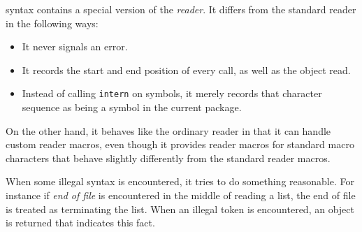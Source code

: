 \commonlisp{} syntax contains a special version of the \commonlisp{}
\emph{reader}.  It differs from the standard reader in the following
ways:

\begin{itemize}
\item It never signals an error.
\item It records the start and end position of every call, as well as
  the object read.
\item Instead of calling \texttt{intern} on symbols, it merely records
  that character sequence as being a symbol in the current package. 
\end{itemize}

On the other hand, it behaves like the ordinary \commonlisp{} reader
in that it can handle custom reader macros, even though it provides
reader macros for standard macro characters that behave slightly
differently from the standard reader macros.

When some illegal syntax is encountered, it tries to do something
reasonable.  For instance if \emph{end of file} is encountered in the
middle of reading a list, the end of file is treated as terminating
the list.  When an illegal token is encountered, an object is returned
that indicates this fact. 


